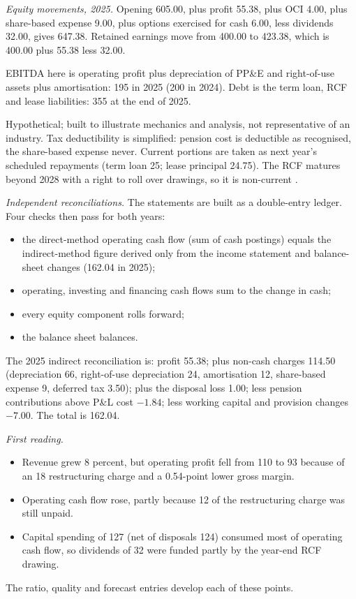 \begin{qfexample}
\emph{Equity movements, 2025.} Opening 605.00, plus profit 55.38, plus OCI 4.00, plus share-based expense 9.00, plus options exercised for cash 6.00, less dividends 32.00, gives 647.38. Retained earnings move from 400.00 to 423.38, which is 400.00 plus 55.38 less 32.00.

 EBITDA here is operating profit plus depreciation of PP\&E and right-of-use assets plus amortisation: 195 in 2025 (200 in 2024). Debt is the term loan, RCF and lease liabilities: 355 at the end of 2025.

 Hypothetical; built to illustrate mechanics and analysis, not representative of an industry. Tax deductibility is simplified: pension cost is deductible as recognised, the share-based expense never. Current portions are taken as next year's scheduled repayments (term loan 25; lease principal 24.75). The RCF matures beyond 2028 with a right to roll over drawings, so it is non-current \citep[Annex, IAS~1 para.~73]{eu-2023-2822-ias1}.

 \emph{Independent reconciliations.} The statements are built as a double-entry ledger. Four checks then pass for both years:
\begin{itemize}
\item the direct-method operating cash flow (sum of cash postings) equals the indirect-method figure derived only from the income statement and balance-sheet changes (162.04 in 2025);
\item operating, investing and financing cash flows sum to the change in cash;
\item every equity component rolls forward;
\item the balance sheet balances.
\end{itemize}
The 2025 indirect reconciliation is: profit 55.38; plus non-cash charges 114.50 (depreciation 66, right-of-use depreciation 24, amortisation 12, share-based expense 9, deferred tax 3.50); plus the disposal loss 1.00; less pension contributions above P\&L cost $-1.84$; less working capital and provision changes $-7.00$. The total is 162.04.

\emph{First reading.}
\begin{itemize}
\item Revenue grew 8 percent, but operating profit fell from 110 to 93 because of an 18 restructuring charge and a 0.54-point lower gross margin.
\item Operating cash flow rose, partly because 12 of the restructuring charge was still unpaid.
\item Capital spending of 127 (net of disposals 124) consumed most of operating cash flow, so dividends of 32 were funded partly by the year-end RCF drawing.
\end{itemize}
The ratio, quality and forecast entries develop each of these points.


\end{qfexample}

